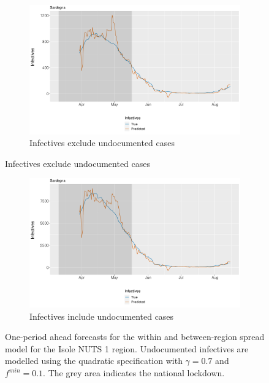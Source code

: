 \documentclass[12pt]{article}
\begin{document}
\begin{appendices}
        \begin{figure}[H]
    	    \centering
    	    \begin{subfigure}{\textwidth}
    	      \centering
    	      \includegraphics[width=0.91\linewidth]{output/model_between_lag14_forecast_start20_Isole_rolling.pdf}
    	      \caption{Infectives exclude undocumented cases}
    	      \label{fig:forecast_between_isole_regular}
    	    \end{subfigure}
        \end{figure}
        \begin{figure}[H]\ContinuedFloat
    	    \begin{subfigure}{\textwidth}
    	      \centering
    	      \includegraphics[width=0.91\linewidth]{output/model_between_lag14_forecast_start20_Isole_UndocQuadratic_rolling.pdf}
    	      \caption{Infectives include undocumented cases}
    	      \label{fig:forecast_between_isole_undoc}
    	    \end{subfigure}
    	    \caption{One-period ahead forecasts for the within and between-region spread model for the Isole NUTS 1 region. Undocumented infectives are modelled using the quadratic specification with $\gamma = 0.7$ and $f^{min}=0.1$. The grey area indicates the national lockdown.}
    	    \label{fig:forecast_between_isole}
        \end{figure}
		

\end{appendices}
\end{document}
